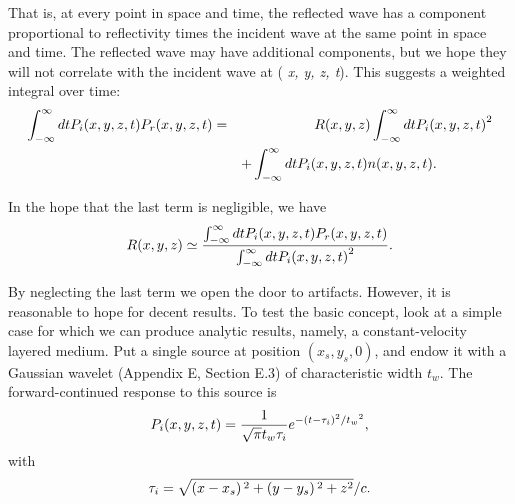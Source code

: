 That is, at every point in space and time, the reflected wave has a component proportional to reflectivity times the incident wave at the same point
in space and time. The reflected wave may have additional components, but we hope they will not correlate with the incident wave at (\textit{
x, y, z, t}). This suggests a weighted integral over time:
\begin{eqnarray}
\int _{-\infty }^{\infty }d\text{\textit{$t$}} \text{\textit{$P_i$}}\text{\textit{$(x,y,z,t)$}}\text{\textit{$ $}}\text{\textit{$P_r$}}\text{\textit{$(x,y,z,t)$}}\text{\textit{$
$}}&=&\text{\textit{$ $}}\text{\textit{$R$}}\text{\textit{$(x,y,z)$}} \int _{-\infty }^{\infty }d\text{\textit{$t$}}\text{\textit{$ $}}\text{\textit{$P_i$}}\text{\textit{$(x,y,z,t)$}}^2\text{\textit{$
$}}\nonumber\\
&&+\int _{-\infty }^{\infty }d\text{\textit{$t$}} \text{\textit{$P_i$}}\text{\textit{$(x,y,z,t)$}}\text{\textit{$ $}}\text{\textit{$n$}}\text{\textit{$(x,y,z,t).$}}\qquad\qquad
\end{eqnarray}

In the hope that the last term is negligible, we have
\begin{equation}\text{\textit{$R(x,y,z)$}}\simeq \frac{\int _{-\infty }^{\infty }d\text{\textit{$t$}} \text{\textit{$P_i$}}\text{\textit{$(x,y,z,t)$}}\text{\textit{$
$}}\text{\textit{$P_r$}}\text{\textit{$(x,y,z,t)$}}\text{\textit{$ $}}}{\int _{-\infty }^{\infty }d\text{\textit{$t$}}\text{\textit{$ $}}\text{\textit{$P_i$}}\text{\textit{$(x,y,z,t)$}}^2\text{\textit{$
$}}}.\end{equation}

By neglecting the last term we open the door to artifacts. However, it is reasonable to hope for decent results.  To test the basic concept,
look at a simple case for which we can produce analytic results, namely, a constant-velocity layered medium. Put a single source at position \(\left(x_s,y_s,0\right)\),
and endow it with a Gaussian wavelet (Appendix E, Section E.3) of characteristic width \(t_w.\) The forward-continued response to this source is
\begin{equation}\text{\textit{$P_i(x,y,z,t)$}}\text{\textit{$ $}}= \frac{1}{\sqrt{\pi }\text{\textit{$t_w$}}\tau _i}e^{-\left(\text{\textit{$t$}}-\tau
_i\right){}^2/\text{\textit{$t_w$}}{}^2},\end{equation}
with
\begin{equation}\tau _i=\sqrt{\left(\text{\textit{$x$}}-\text{\textit{$x_s$}}\right){}^2+\left(\text{\textit{$y$}}-\text{\textit{$y_s$}}\right){}^2+\text{\textit{$z$}}^2}/\text{\textit{$c.$}}\end{equation}

